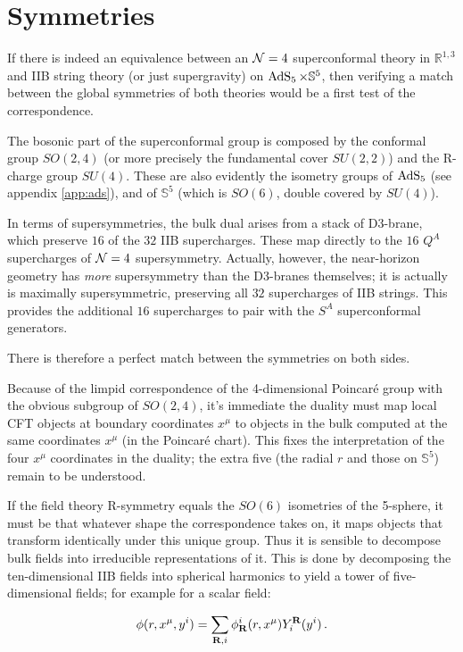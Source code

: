 \section{Symmetries}

If there is indeed an equivalence between an $\mathcal{N} = 4$ superconformal theory in $\mathbb{R}^{1,3}$ and IIB string theory (or just supergravity) on $\operatorname{AdS}_{5}\times\mathbb{S}^5$, then verifying a match between the global symmetries of both theories would be a first test of the correspondence.

The bosonic part of the superconformal group is composed by the conformal group $SO(2,4)$ (or more precisely the fundamental cover $SU(2,2)$) and the R-charge group $SU(4)$. These are also evidently the isometry groups of $\operatorname{AdS}_{5}$ (see appendix \ref{app:ads}), and of $\mathbb{S}^5$ (which is $SO(6)$, double covered by $SU(4)$).

In terms of supersymmetries, the bulk dual arises from a stack of D3-brane, which preserve $16$ of the $32$ IIB supercharges. These map directly to the $16$ $Q^A$ supercharges of $\mathcal{N} = 4$ supersymmetry. Actually, however, the near-horizon geometry has \emph{more} supersymmetry than the D3-branes themselves; it is actually is maximally supersymmetric, preserving all $32$ supercharges of IIB strings. This provides the additional $16$ supercharges to pair with the $S^A$ superconformal generators.

There is therefore a perfect match between the symmetries on both sides.

Because of the limpid correspondence of the 4-dimensional Poincar\'e group with the obvious subgroup of $SO(2,4)$, it's immediate the duality must map local CFT objects at boundary coordinates $x^\mu$ to objects in the bulk computed at the same coordinates $x^\mu$ (in the Poincar\'e chart). This fixes the interpretation of the four $x^\mu$ coordinates in the duality; the extra five (the radial $r$ and those on $\mathbb{S}^5$) remain to be understood.

If the field theory R-symmetry equals the $SO(6)$ isometries of the 5-sphere, it must be that whatever shape the correspondence takes on, it maps objects that transform identically under this unique group. Thus it is sensible to decompose bulk fields into irreducible representations of it. This is done by decomposing the ten-dimensional IIB fields into spherical harmonics to yield a tower of five-dimensional fields; for example for a scalar field:

\begin{equation}
	\phi(r,x^\mu,y^i) = \sum_{\mathbf{R},i}  \phi_{\mathbf{R}}^i(r,x^\mu) Y^{\mathbf{R}}_i (y^i)\,.
	\label{}
\end{equation}

